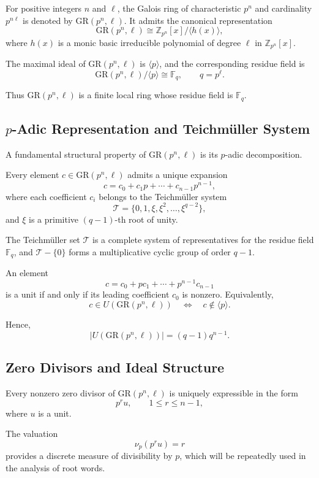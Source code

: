 \documentclass[10pt]{article}
\theoremstyle{definition}
\begin{document}
For positive integers $n$ and $\ell$,
the Galois ring of characteristic $p^n$
and cardinality $p^{n\ell}$ is denoted by $\mathrm{GR}(p^{n},\ell)$.
It admits the canonical representation
\[
\mathrm{GR}(p^{n},\ell)
\cong
\mathbb{Z}_{p^{n}}[x]/\langle h(x)\rangle,
\]
where $h(x)$ is a monic basic irreducible polynomial
of degree $\ell$ in $\mathbb{Z}_{p^{n}}[x]$.

The maximal ideal of $\mathrm{GR}(p^{n},\ell)$ is $\langle p\rangle$,
and the corresponding residue field is
\[
\mathrm{GR}(p^{n},\ell)/\langle p\rangle
\cong \mathbb{F}_{q},
\qquad q=p^{\ell}.
\]

Thus $\mathrm{GR}(p^{n},\ell)$ is a finite local ring
whose residue field is $\mathbb{F}_q$.

\subsection{$p$-Adic Representation and Teichm\"uller System}

A fundamental structural property of $\mathrm{GR}(p^{n},\ell)$
is its $p$-adic decomposition.

Every element $c \in \mathrm{GR}(p^{n},\ell)$
admits a unique expansion
\[
c = c_0 + c_1 p + \cdots + c_{n-1} p^{n-1},
\]
where each coefficient $c_i$ belongs to the Teichm\"uller system
\[
\mathcal{T}
=
\{0,1,\xi,\xi^2,\dots,\xi^{q-2}\},
\]
and $\xi$ is a primitive $(q-1)$-th root of unity.

The Teichm\"uller set $\mathcal{T}$
is a complete system of representatives
for the residue field $\mathbb{F}_q$,
and $\mathcal{T}-\{0\}$ forms a multiplicative cyclic group of order $q-1$.

An element
\[
c=c_0 + p c_1 + \cdots + p^{n-1} c_{n-1}
\]
is a unit if and only if its leading coefficient $c_0$ is nonzero.
Equivalently,
\[
c \in U(\mathrm{GR}(p^{n},\ell))
\quad \Longleftrightarrow \quad
c \notin \langle p\rangle.
\]

Hence,
\[
|U(\mathrm{GR}(p^{n},\ell))|
=
(q-1)q^{n-1}.
\]

\subsection{Zero Divisors and Ideal Structure}

Every nonzero zero divisor of $\mathrm{GR}(p^{n},\ell)$
is uniquely expressible in the form
\[
p^{r}u,
\qquad 1 \le r \le n-1,
\]
where $u$ is a unit.

The valuation
\[
\nu_p(p^{r}u)=r
\]
provides a discrete measure of divisibility by $p$,
which will be repeatedly used in the analysis of root words.
\end{document}
